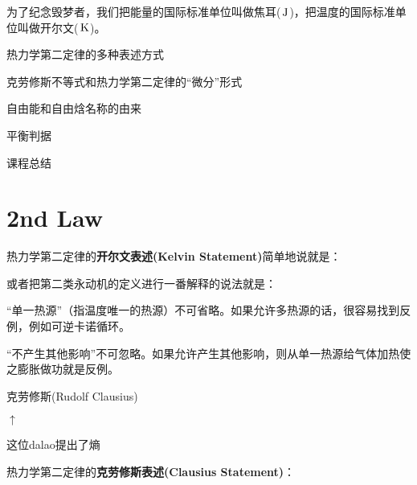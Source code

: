 \documentclass[CJK]{beamer}
\begin{document}
\begin{frame}
\bch
{}

为了纪念毁梦者，我们把能量的国际标准单位叫做焦耳($\,\mathrm{J}$)，把温度的国际标准单位叫做开尔文($\,\mathrm{K}$)。
\ech
\end{frame}

\begin{frame}
\bch
\bitem
\item{热力学第二定律的多种表述方式}
\item{克劳修斯不等式和热力学第二定律的“微分”形式}
\item{自由能和自由焓名称的由来}
\item{平衡判据}
\item{课程总结}
\eitem
\ech
\end{frame}

\section{2nd Law}


\begin{frame}
\bch
热力学第二定律的{\bf 开尔文表述(Kelvin Statement)}简单地说就是：

或者把第二类永动机的定义进行一番解释的说法就是：
\ech
\end{frame}

\begin{frame}
\bch
\bitem
\item{“单一热源”（指温度唯一的热源）不可省略。如果允许多热源的话，很容易找到反例，例如可逆卡诺循环。}
\item{“不产生其他影响”不可忽略。如果允许产生其他影响，则从单一热源给气体加热使之膨胀做功就是反例。}
\eitem

\ech
\end{frame}

\begin{frame}
\bch

\bcenter
克劳修斯(Rudolf Clausius)
\ecenter


\bcenter
$\uparrow$

这位dalao提出了熵
\ecenter
\ech
\end{frame}

\begin{frame}
\bch
热力学第二定律的{\bf 克劳修斯表述(Clausius Statement)}：
\ech
\end{frame}
\end{document}
